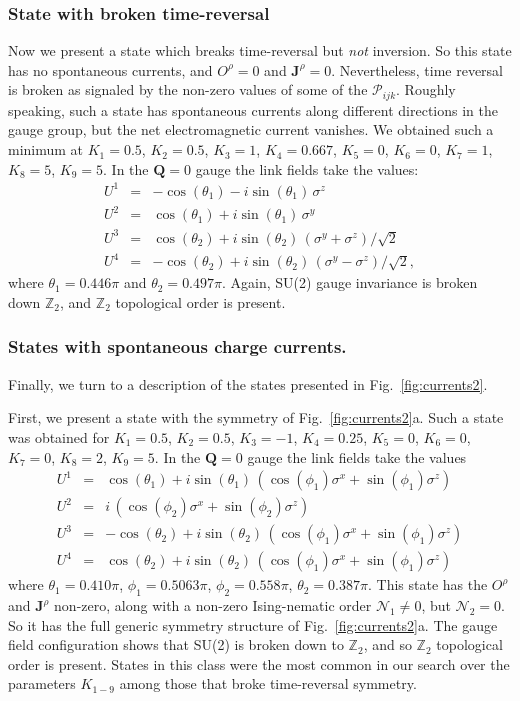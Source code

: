 \documentclass[aps,prb,preprint,onecolumn,citeautoscript,superscriptaddress,footinbib,
eqsecnum]{revtex4-1}
\def\bea{\begin{eqnarray}}
\def\eea{\end{eqnarray}}
\newcommand{\nn}{\nonumber \\}
\begin{document}
\subsubsection{State with broken time-reversal}

Now we present a state which breaks time-reversal but {\it not\/} inversion. So this state has
no spontaneous currents, and $O^\rho =0 $ and ${\bm J}^\rho =0 $. Nevertheless, time reversal
is broken as signaled by the non-zero values of some of the $\mathcal{P}_{ijk}$. Roughly speaking,
such a state has spontaneous currents along different directions in the gauge group, but the
net electromagnetic current vanishes. We obtained such a
minimum at $K_1=0.5$, $K_2 = 0.5$, $K_3 = 1$, $K_4 =0.667$, $K_5 =0$, $K_6 =0$, $K_7 = 1$,
$K_8=5$, $K_9=5$. In the ${\bm Q}=0$ gauge the link fields take the values:
\bea
U^1 &=& -\cos (\theta_1) - i \sin (\theta_1) \,  \sigma^z \nn 
U^2 &=& \cos (\theta_1) + i \sin (\theta_1) \,  \sigma^y \nn
U^3 &=& \cos (\theta_2) + i \sin (\theta_2) \,  (\sigma^y + \sigma^z)/\sqrt{2} \nn
U^4 &=& -\cos (\theta_2) + i \sin (\theta_2) \,  (\sigma^y - \sigma^z)/\sqrt{2},
\eea 
where $\theta_1 = 0.446 \pi$ and $\theta_2 = 0.497  \pi$. Again, SU(2) gauge invariance is broken down $\mathbb{Z}_2$,
and $\mathbb{Z}_2$ topological order is present.

\subsubsection{States with spontaneous charge currents.}

Finally, we turn to a description of the states presented in Fig.~\ref{fig:currents2}.

First, we present a state with the symmetry of Fig.~\ref{fig:currents2}a.
Such a state was obtained for $K_1=0.5$, $K_2 = 0.5$, $K_3 = -1$, $K_4 = 0.25$, $K_5 =0$, $K_6 =0$, $K_7 = 0$,
$K_8=2$, $K_9=5$. In the ${\bm Q}=0$ gauge the link fields take the values
\bea
U^1 &=& \cos (\theta_1) + i \sin (\theta_1) \, (\cos( \phi_1) \sigma^x + \sin (\phi_1) \sigma^z) \nn
U^2 &=& i \, (\cos( \phi_2) \sigma^x + \sin (\phi_2) \sigma^z) \nn
U^3 &=& -\cos (\theta_2) + i \sin (\theta_2) \, (\cos( \phi_1) \sigma^x + \sin (\phi_1) \sigma^z) \nn
U^4 &=& \cos (\theta_2) + i \sin (\theta_2) \, (\cos( \phi_1) \sigma^x + \sin (\phi_1) \sigma^z) 
\eea 
where $\theta_1 = 0.410 \pi$, $\phi_1 = 0.5063 \pi$, $\phi_2 = 0.558 \pi$, $\theta_2 = 0.387 \pi$.
This state has the $O^\rho$ and ${\bm J}^\rho$ non-zero, along with a non-zero Ising-nematic
order $\mathcal{N}_1 \neq 0$, but $\mathcal{N}_2 = 0$. So it has the full generic symmetry structure
of Fig.~\ref{fig:currents2}a. 
The gauge field configuration shows that SU(2) is broken down to $\mathbb{Z}_2$, and so $\mathbb{Z}_2$ topological order is present.
States in this class were the most common in our search over the
parameters $K_{1-9}$ among those
that broke time-reversal symmetry.
\end{document}
